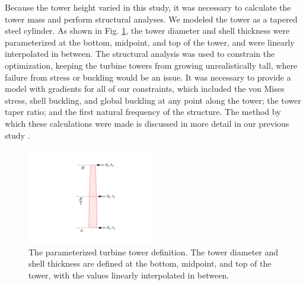 Because the tower height varied in this study, it was necessary to calculate the tower mass and perform structural analyses.
We modeled the tower as a tapered steel cylinder. As shown in Fig. \ref{tower_def}, the tower diameter and shell thickness were parameterized at the bottom, midpoint, and top of the tower, and were linearly interpolated in between.
The structural analysis was used to constrain the optimization, keeping the turbine towers from growing unrealistically tall, where failure from stress or buckling would be an issue. 
It was necessary to provide a model with gradients for all of our constraints, which included the von Mises stress, shell buckling, and global buckling at any point along the tower; the tower taper ratio; and the first natural frequency of the structure. The method by which these calculations were made is discussed in more detail in our previous study \citep{stanley2018}.

\begin{figure}[htbp]
  \centering
  \includegraphics[width=0.5\textwidth]{Figures/tower_param.pdf}
  \caption{\label{tower_def} The parameterized turbine tower definition. The tower diameter and shell thickness are defined at the bottom, midpoint, and top of the tower, with the values linearly interpolated in between.}
\end{figure}

